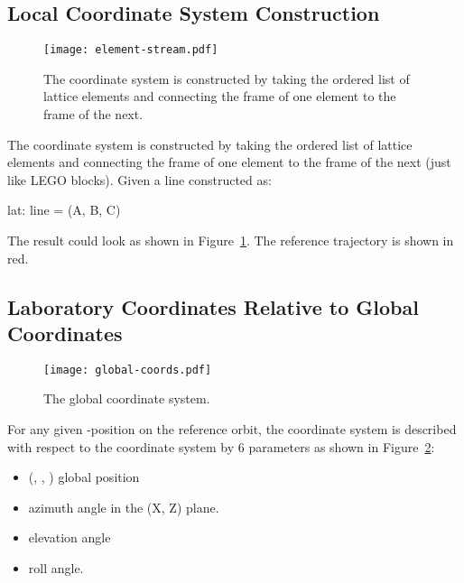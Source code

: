 \documentclass{hitec}     %
\begin{document}
{%
\subsection{Local Coordinate System Construction}

\begin{figure}[tb]
  \centering
  \texttt{[image: element-stream.pdf]}
  \caption{The  coordinate system is constructed by taking the ordered list of lattice elements and
connecting the  frame of one element to the  frame of the next.}
  \label{f:leggo}
\end{figure}

The  coordinate system is constructed by taking the ordered list of lattice elements and
connecting the   frame of one element to the  
frame of the next (just like LEGO blocks). Given a line constructed as:
\begin{code}
    lat: line = (A, B, C)
\end{code}
The result could look as shown in Figure~\ref{f:leggo}. The reference trajectory is shown in
red.

\newpage

\subsection{Laboratory Coordinates Relative to Global Coordinates}
\label{s:lab.rel.glob}

\begin{figure}[tb]
  \centering
  \texttt{[image: global-coords.pdf]}
  \caption{The global coordinate system.}
  \label{f:global}
\end{figure}

For any given -position on the reference orbit, the  coordinate system is described with
respect to the  coordinate system by 6 parameters as shown in Figure~\ref{f:global}:
\vspace{-5 pt}
\begin{itemize}
\item (, , ) global position
\item \vn{$\theta$} azimuth angle in the (X, Z) plane.
\item \vn{$\phi$} elevation angle
\item \vn{$\psi$} roll angle.
\end{itemize}

}
\end{document}
